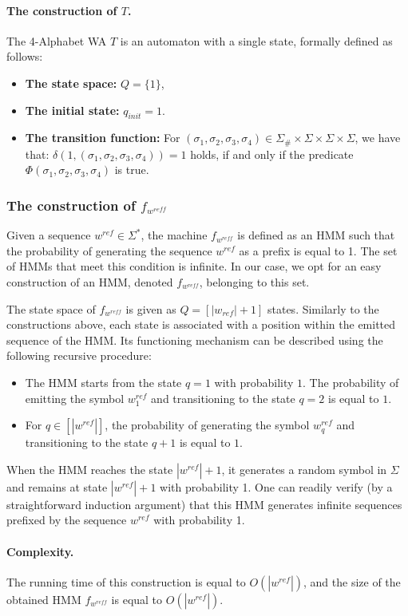\paragraph{The construction of $T$.} The 4-Alphabet WA $T$ is an automaton with a single state, formally defined as follows:
\begin{itemize}
    \item \textbf{The state space:} $Q = \{1\}$,
    \item \textbf{The initial state:} $q_{init} = 1$.
    \item \textbf{The transition function:} For $(\sigma_{1}, \sigma_{2}, \sigma_{3}, \sigma_{4}) \in \Sigma_{\#} \times \Sigma \times \Sigma \times \Sigma$, we have that:
    $\delta(1, (\sigma_{1}, \sigma_{2}, \sigma_{3}, \sigma_{4})) = 1$ holds, if and only if the predicate $\Phi(\sigma_{1}, \sigma_{2}, \sigma_{3}, \sigma_{4})$ is true. 
\end{itemize}

\subsubsection{The construction of $f_{w^{reff}}$}
Given a sequence $w^{ref} \in \Sigma^{*}$, the machine $f_{w^{reff}}$ is defined as an HMM such that the probability of generating the sequence $w^{ref}$ as a prefix is equal to 1. The set of HMMs that meet this condition is infinite. In our case, we opt for an easy construction of an HMM, denoted $f_{w^{reff}}$, belonging to this set.

The state space of $f_{w^{reff}}$ is given as $Q = [|w_{ref}| + 1]$ states. Similarly to the constructions above, each state is associated with a position within the emitted sequence of the HMM. Its functioning mechanism can be described using the following recursive procedure: 
\begin{itemize}
    \item The HMM starts from the state $q = 1$ with probability $1$. The probability of emitting the symbol $w^{ref}_{1}$ and transitioning to the state $q= 2$ is equal to $1$.
    \item For $q \in [|w^{ref}|]$, the probability of generating the symbol $w^{ref}_{q}$ and transitioning to the state $q+1$ is equal to $1$.
\end{itemize}
When the HMM reaches the state $|w^{ref}| + 1$, it generates a random symbol in $\Sigma$ and remains at state $|w^{ref}| + 1$ with probability 1. One can readily verify (by a straightforward induction argument) that this HMM generates infinite sequences prefixed by the sequence $w^{ref}$ with probability 1. 

\paragraph{Complexity.} The running time of this construction is equal to $O(|w^{ref}|)$, and the size of the obtained HMM $f_{w^{reff}}$ is equal to $O(|w^{ref}|)$.